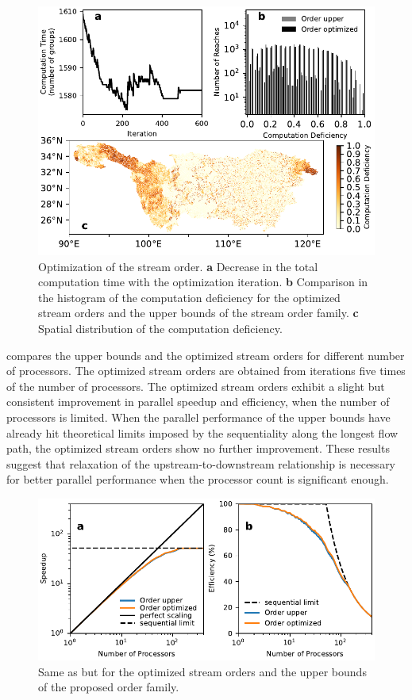 \documentclass[water,article,submit,pdftex,moreauthors]{Definitions/mdpi}
\begin{document}
\begin{figure}[H]
    \includegraphics[width=13.5 cm]{fig/optimization_iteration_yangtze.pdf}
    \caption{Optimization of the stream order. \textbf{a} Decrease in the total computation time with the optimization iteration. \textbf{b} Comparison in the histogram of the computation deficiency for the optimized stream orders and the upper bounds of the stream order family. \textbf{c} Spatial distribution of the computation deficiency. \label{fig:optimization_iteration_yangtze}}
\end{figure}

 compares the upper bounds and the optimized stream orders for different number of processors. The optimized stream orders are obtained from iterations five times of the number of processors. The optimized stream orders exhibit a slight but consistent improvement in parallel speedup and efficiency, when the number of processors is limited. When the parallel performance of the upper bounds have already hit theoretical limits imposed by the sequentiality along the longest flow path, the optimized stream orders show no further improvement. These results suggest that relaxation of the upstream-to-downstream relationship is necessary for better parallel performance when the processor count is significant enough.

\begin{figure}[H]
    \includegraphics[width=12.5 cm]{fig/speedup_opt_yangtze.pdf}
    \caption{Same as  but for the optimized stream orders and the upper bounds of the proposed order family. \label{fig:order_optmization_yangtze}}
\end{figure}
\end{document}
